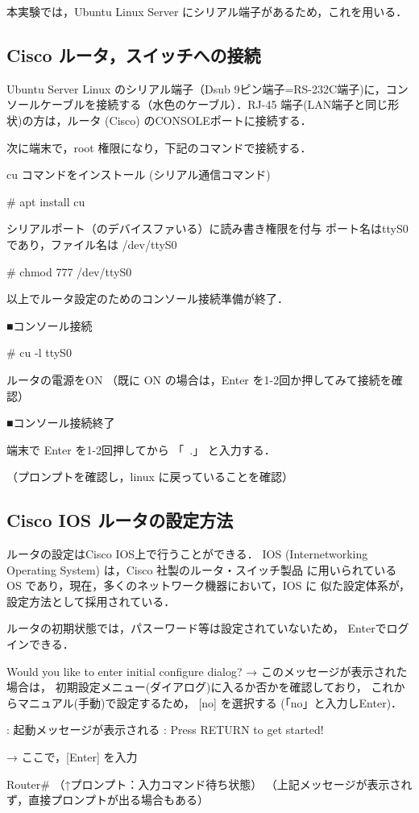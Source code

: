 本実験では，Ubuntu Linux Server にシリアル端子があるため，これを用いる．

\subsection{Cisco ルータ，スイッチへの接続}
Ubuntu Server Linux のシリアル端子（Dsub 9ピン端子=RS-232C端子)に，コンソールケーブルを接続する（水色のケーブル）．RJ-45 端子(LAN端子と同じ形状)の方は，ルータ (Cisco) のCONSOLEポートに接続する．

次に端末で，root 権限になり，下記のコマンドで接続する．
\begin{cli}
cu コマンドをインストール
(シリアル通信コマンド)

# apt install cu

シリアルポート（のデバイスファいる）に読み書き権限を付与
ポート名はttyS0であり，ファイル名は /dev/ttyS0

# chmod 777 /dev/ttyS0

以上でルータ設定のためのコンソール接続準備が終了．

■コンソール接続

# cu -l ttyS0

ルータの電源をON
（既に ON の場合は，Enter を1-2回か押してみて接続を確認）

■コンソール接続終了

端末で Enter を1-2回押してから
「~.」
と入力する．

（プロンプトを確認し，linux に戻っていることを確認）

\end{cli}


\subsection{Cisco IOS ルータの設定方法}
ルータの設定はCisco IOS上で行うことができる．
IOS (Internetworking Operating System) は，Cisco 社製のルータ・スイッチ製品
に用いられている OS であり，現在，多くのネットワーク機器において，IOS に
似た設定体系が，設定方法として採用されている．

ルータの初期状態では，パスーワード等は設定されていないため，
Enterでログインできる．

\begin{cli}
Would you like to enter initial configure dialog?
   → このメッセージが表示された場合は，
      初期設定メニュー(ダイアログ)に入るか否かを確認しており，
      これからマニュアル(手動)で設定するため，
      [no] を選択する (「no」と入力しEnter)．

     : 起動メッセージが表示される
     :
Press RETURN to get started!

  → ここで，[Enter] を入力

Router#
（↑プロンプト：入力コマンド待ち状態）
（上記メッセージが表示されず，直接プロンプトが出る場合もある）
\end{cli}


